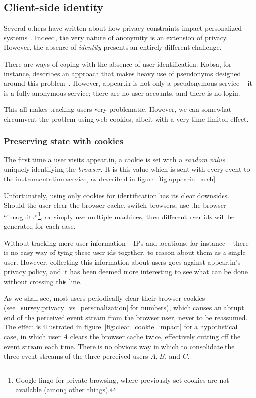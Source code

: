   \subsection{Client-side identity}
  \label{survey:client_side_identity}

    Several others have written about how privacy constraints impact personalized systems~\cite{Teltzrow2004,Kobsa2007}. Indeed, the very nature of anonymity is an extension of privacy. However, the absence of \emph{identity} presents an entirely different challenge.

    There are ways of coping with the absence of user identification. Kobsa, for instance, describes an approach that makes heavy use of pseudonyms designed around this problem~\cite{Kobsa2003}. However, appear.in is not only a pseudonymous service -- it is a fully anonymous service; there are no user accounts, and there is no login.

    This all makes tracking users very problematic. However, we can somewhat circumvent the problem using web cookies, albeit with a very time-limited effect.

    \subsubsection{Preserving state with cookies}
    \label{survey:state_with_cookies}

      The first time a user visits appear.in, a cookie is set with a \emph{random value} uniquely identifying the \emph{browser}. It is this value which is sent with every event to the instrumentation service, as described in figure~\ref{fig:appearin_arch}.

      Unfortunately, using only cookies for identification has its clear downsides. Should the user clear the browser cache, switch browsers, use the browser ``incognito''\footnote{Google lingo for private browsing, where previously set cookies are not available (among other things).}, or simply use multiple machines, then different user ids will be generated for each case.

      Without tracking more user information -- IPs and locations, for instance -- there is no easy way of tying these user ids together, to reason about them as a single user. However, collecting this information about users goes against appear.in's privacy policy, and it has been deemed more interesting to see what can be done without crossing this line.

      As we shall see, most users periodically clear their browser cookies (see~\ref{survey:privacy_vs_personalization} for numbers), which causes an abrupt end of the perceived event stream from the browser user, never to be reassumed. The effect is illustrated in figure~\ref{fig:clear_cookie_impact} for a hypothetical case, in which user $A$ clears the browser cache twice, effectively cutting off the event stream each time. There is no obvious way in which to consolidate the three event streams of the three perceived users $A$, $B$, and $C$.

